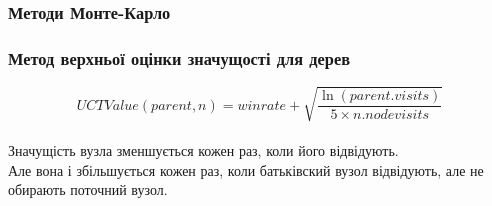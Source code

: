\documentclass{beamer}
\begin{document}
\begin{frame}[fragile]
    \frametitle{Методи Монте-Карло}
    \begin{figure}
    \end{figure}

\end{frame}

\begin{frame}
    \frametitle{Метод верхньої оцінки значущості для дерев}
    \begin{equation*}
        UCTValue(parent,n)=winrate+\sqrt{\frac{\ln(parent.visits)}{5\times n.nodevisits}}
    \end{equation*}\\
    \bigskip
    Значущість вузла зменшується кожен раз, коли його відвідують. \\
    \medskip
    Але вона і збільшується кожен раз, коли батьківский вузол відвідують, але не обирають поточний вузол.
\end{frame}
\end{document}
